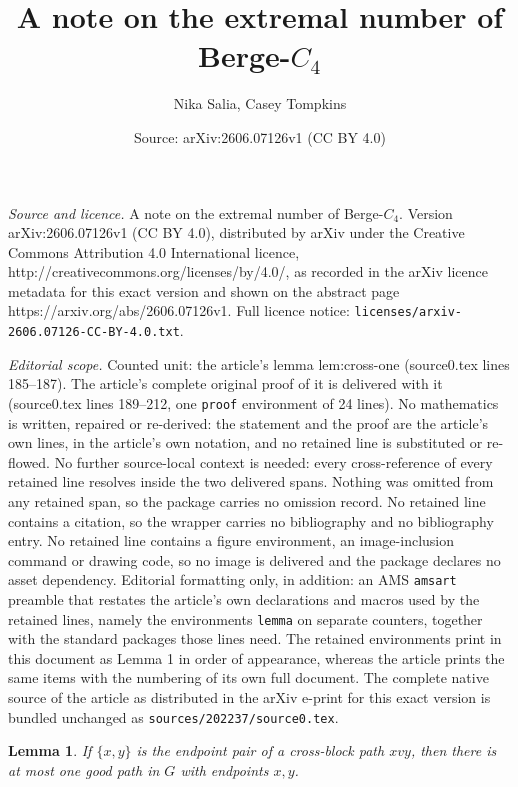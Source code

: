 \documentclass[10pt,a4paper]{amsart}
\title{A note on the extremal number of Berge-\texorpdfstring{$C_4$}{C4}}
\author{Nika Salia, Casey Tompkins}
\date{Source: arXiv:2606.07126v1 (CC BY 4.0)}
\newtheorem{lemma}{Lemma}
\begin{document}
\maketitle

\noindent\emph{Source and licence.} A note on the extremal number of Berge-\texorpdfstring{$C_4$}{C4}. Version arXiv:2606.07126v1 (CC BY 4.0), distributed by arXiv under the Creative Commons Attribution 4.0 International licence, http://creativecommons.org/licenses/by/4.0/, as recorded in the arXiv licence metadata for this exact version and shown on the abstract page https://arxiv.org/abs/2606.07126v1. Full licence notice: \texttt{licenses/arxiv-2606.07126-CC-BY-4.0.txt}.\par\smallskip

\noindent\textit{Editorial scope.} Counted unit: the article's lemma lem:cross-one (source0.tex lines 185--187). The article's complete original proof of it is delivered with it (source0.tex lines 189--212, one \texttt{proof} environment of 24 lines). No mathematics is written, repaired or re-derived: the statement and the proof are the article's own lines, in the article's own notation, and no retained line is substituted or re-flowed.  No further source-local context is needed: every cross-reference of every retained line resolves inside the two delivered spans.  Nothing was omitted from any retained span, so the package carries no omission record.  No retained line contains a citation, so the wrapper carries no bibliography and no bibliography entry.  No retained line contains a figure environment, an image-inclusion command or drawing code, so no image is delivered and the package declares no asset dependency.  Editorial formatting only, in addition: an AMS \texttt{amsart} preamble that restates the article's own declarations and macros used by the retained lines, namely the environments \texttt{lemma} on separate counters, together with the standard packages those lines need.  The retained environments print in this document as Lemma 1 in order of appearance, whereas the article prints the same items with the numbering of its own full document.  The complete native source of the article as distributed in the arXiv e-print for this exact version is bundled unchanged as \texttt{sources/202237/source0.tex}.
\begin{lemma}\label{lem:cross-one}
If $\{x,y\}$ is the endpoint pair of a cross-block path $xvy$, then there is at most one good path in $G$ with endpoints $x,y$.
\end{lemma}
\end{document}
